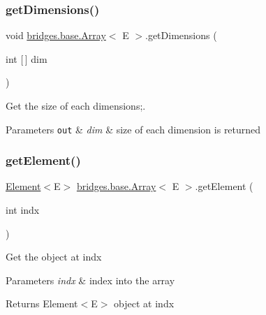 \subsubsection{\texorpdfstring{get\+Dimensions()}{getDimensions()}}
{\footnotesize\ttfamily void \hyperlink{classbridges_1_1base_1_1_array}{bridges.\+base.\+Array}$<$ E $>$.get\+Dimensions (\begin{DoxyParamCaption}\item[{int \mbox{[}$\,$\mbox{]}}]{dim }\end{DoxyParamCaption})}



Get the size of each dimensions;. 


\begin{DoxyParams}[1]{Parameters}
\mbox{\tt out}  & {\em dim} & size of each dimension is returned \\
\hline
\end{DoxyParams}
\mbox{\label{classbridges_1_1base_1_1_array_a0e690cbe2606e44cce99b56802b63e0e}} 
\subsubsection{\texorpdfstring{get\+Element()}{getElement()}}
{\footnotesize\ttfamily \hyperlink{classbridges_1_1base_1_1_element}{Element}$<$E$>$ \hyperlink{classbridges_1_1base_1_1_array}{bridges.\+base.\+Array}$<$ E $>$.get\+Element (\begin{DoxyParamCaption}\item[{int}]{indx }\end{DoxyParamCaption})\hspace{0.3cm}{\ttfamily [protected]}}

Get the object at \textquotesingle{}indx\textquotesingle{}


\begin{DoxyParams}{Parameters}
{\em indx} & index into the array \\
\hline
\end{DoxyParams}
\begin{DoxyReturn}{Returns}
Element$<$\+E$>$ object at \textquotesingle{}indx\textquotesingle{} 
\end{DoxyReturn}
\mbox{\label{classbridges_1_1base_1_1_array_a808da9a62df3f0e7a905ec895a82087a}} 
